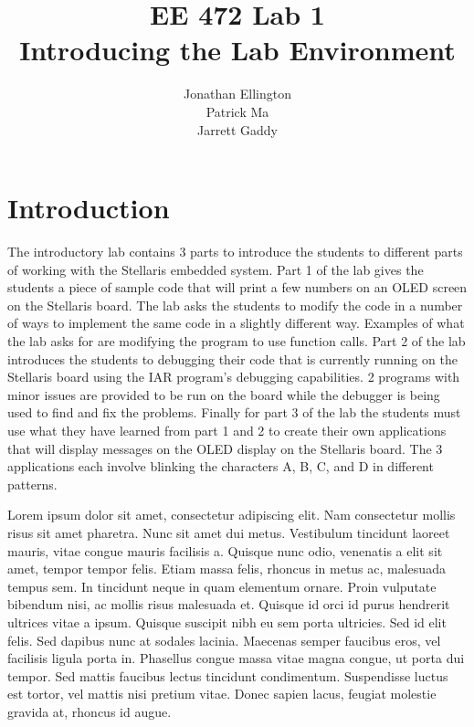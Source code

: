 \documentclass[12pt]{article} %
\title{\TitleFont EE 472 Lab 1 \\ Introducing the Lab Environment \vfill }
\author{\AuthorFont Jonathan Ellington \\ Patrick Ma \\ Jarrett Gaddy}
\date{}
\begin{document}
\maketitle
\thispagestyle{empty}
\pagebreak
\tableofcontents
\listoftables
\listoffigures
\thispagestyle{empty}
\pagebreak
\setcounter{page}{1}

\section{Introduction}

The introductory lab contains 3 parts to introduce the students to different parts of working with the Stellaris embedded system. Part 1 of the lab gives the students a piece of sample code that will print a few numbers on an OLED screen on the Stellaris board. The lab asks the students to modify the code in a number of ways to implement the same code in a slightly different way. Examples of what the lab asks for are modifying the program to use function calls. Part 2 of the lab introduces the students to debugging their code that is currently running on the Stellaris board using the IAR program’s debugging capabilities. 2 programs with minor issues are provided to be run on the board while the debugger is being used to find and fix the problems. Finally for part 3 of the lab the students must use what they have learned from part 1 and 2 to create their own applications that will display messages on the OLED display on the Stellaris board. The 3 applications each involve blinking the characters A, B, C, and D in different patterns.

Lorem ipsum dolor sit amet, consectetur adipiscing elit. Nam consectetur mollis risus sit amet pharetra. Nunc sit amet dui metus. Vestibulum tincidunt laoreet mauris, vitae congue mauris facilisis a. Quisque nunc odio, venenatis a elit sit amet, tempor tempor felis. Etiam massa felis, rhoncus in metus ac, malesuada tempus sem. In tincidunt neque in quam elementum ornare. Proin vulputate bibendum nisi, ac mollis risus malesuada et. Quisque id orci id purus hendrerit ultrices vitae a ipsum. Quisque suscipit nibh eu sem porta ultricies. Sed id elit felis. Sed dapibus nunc at sodales lacinia. Maecenas semper faucibus eros, vel facilisis ligula porta in. Phasellus congue massa vitae magna congue, ut porta dui tempor. Sed mattis faucibus lectus tincidunt condimentum. Suspendisse luctus est tortor, vel mattis nisi pretium vitae. Donec sapien lacus, feugiat molestie gravida at, rhoncus id augue.
\end{document}
